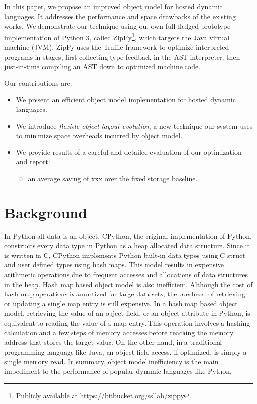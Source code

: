 In this paper, we propose an improved object model for hosted dynamic languages.
It addresses the performance and space drawbacks of the existing works.
We demonstrate our technique using our own full-fledged prototype implementation of Python 3, called ZipPy\footnote{Publicly available at \url{https://bitbucket.org/ssllab/zippy}}, which targets the Java virtual machine (JVM).
ZipPy uses the Truffle framework to optimize interpreted programs in stages, first collecting type feedback in the AST interpreter, then just-in-time compiling an AST down to optimized machine code.

\noindent{}Our contributions are:

\begin{itemize}

\item We present an efficient object model implementation for hosted dynamic languages.

\item We introduce \emph{flexible object layout evolution}, a new technique our system uses to minimize space overheads incurred by object model.

\item We provide results of a careful and detailed evaluation of our optimization and report:
  \begin{itemize}
  \item an average saving of xxx over the fixed storage baseline.
  \end{itemize}
\end{itemize}

\section{Background}

In Python all data is an object.
CPython, the original implementation of Python, constructs every data type in Python as a heap allocated data structure.
Since it is written in C, CPython implements Python built-in data types using C struct and user defined types using hash maps.
This model results in expensive arithmetic operations due to frequent accesses and allocations of data structures in the heap.
Hash map based object model is also inefficient.
Although the cost of hash map operations is amortized for large data sets, the overhead of retrieving or updating a single map entry is still expensive.
In a hash map based object model, retrieving the value of an object field, or an object attribute in Python, is equivalent to reading the value of a map entry.
This operation involves a hashing calculation and a few steps of memory accesses before reaching the memory address that stores the target value.
On the other hand, in a traditional programming language like Java, an object field access, if optimized, is simply a single memory read.
In summary, object model inefficiency is the main impediment to the performance of popular dynamic languages like Python.

